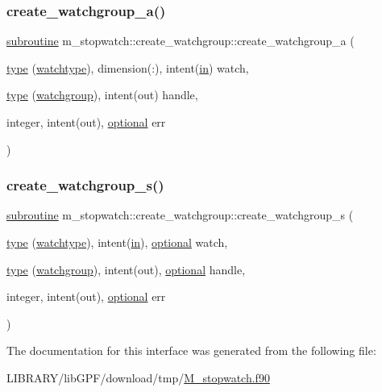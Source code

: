 \subsubsection{\texorpdfstring{create\+\_\+watchgroup\+\_\+a()}{create\_watchgroup\_a()}}
{\footnotesize\ttfamily \hyperlink{M__stopwatch_83_8txt_acfbcff50169d691ff02d4a123ed70482}{subroutine} m\+\_\+stopwatch\+::create\+\_\+watchgroup\+::create\+\_\+watchgroup\+\_\+a (\begin{DoxyParamCaption}\item[{\hyperlink{stop__watch_83_8txt_a70f0ead91c32e25323c03265aa302c1c}{type} (\hyperlink{structm__stopwatch_1_1watchtype}{watchtype}), dimension(\+:), intent(\hyperlink{M__journal_83_8txt_afce72651d1eed785a2132bee863b2f38}{in})}]{watch,  }\item[{\hyperlink{stop__watch_83_8txt_a70f0ead91c32e25323c03265aa302c1c}{type} (\hyperlink{structm__stopwatch_1_1watchgroup}{watchgroup}), intent(out)}]{handle,  }\item[{integer, intent(out), \hyperlink{option__stopwatch_83_8txt_aa4ece75e7acf58a4843f70fe18c3ade5}{optional}}]{err }\end{DoxyParamCaption})\hspace{0.3cm}{\ttfamily [private]}}

\mbox{\label{interfacem__stopwatch_1_1create__watchgroup_aab128b0c24f995d5330559bf3faf6848}} 
\subsubsection{\texorpdfstring{create\+\_\+watchgroup\+\_\+s()}{create\_watchgroup\_s()}}
{\footnotesize\ttfamily \hyperlink{M__stopwatch_83_8txt_acfbcff50169d691ff02d4a123ed70482}{subroutine} m\+\_\+stopwatch\+::create\+\_\+watchgroup\+::create\+\_\+watchgroup\+\_\+s (\begin{DoxyParamCaption}\item[{\hyperlink{stop__watch_83_8txt_a70f0ead91c32e25323c03265aa302c1c}{type} (\hyperlink{structm__stopwatch_1_1watchtype}{watchtype}), intent(\hyperlink{M__journal_83_8txt_afce72651d1eed785a2132bee863b2f38}{in}), \hyperlink{option__stopwatch_83_8txt_aa4ece75e7acf58a4843f70fe18c3ade5}{optional}}]{watch,  }\item[{\hyperlink{stop__watch_83_8txt_a70f0ead91c32e25323c03265aa302c1c}{type} (\hyperlink{structm__stopwatch_1_1watchgroup}{watchgroup}), intent(out), \hyperlink{option__stopwatch_83_8txt_aa4ece75e7acf58a4843f70fe18c3ade5}{optional}}]{handle,  }\item[{integer, intent(out), \hyperlink{option__stopwatch_83_8txt_aa4ece75e7acf58a4843f70fe18c3ade5}{optional}}]{err }\end{DoxyParamCaption})\hspace{0.3cm}{\ttfamily [private]}}



The documentation for this interface was generated from the following file\+:\begin{DoxyCompactItemize}
\item 
L\+I\+B\+R\+A\+R\+Y/lib\+G\+P\+F/download/tmp/\hyperlink{M__stopwatch_8f90}{M\+\_\+stopwatch.\+f90}\end{DoxyCompactItemize}
